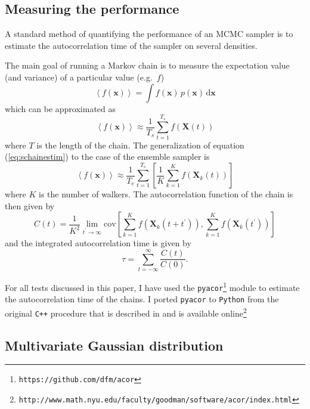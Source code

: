 \documentclass[12pt,preprint]{aastex}
\newcommand{\project}[1]{\texttt{#1}}
\newcommand{\eq}[1]{equation (\ref{eq:#1})}
\newcommand{\eqlabel}[1]{\label{eq:#1}}
\newcommand{\dd}{\mathrm{d}}
\begin{document}
\subsection{Measuring the performance}

A standard method of quantifying the performance of an MCMC sampler is to estimate
the autocorrelation time of the sampler on several densities.

The main goal of running a Markov chain is to measure the expectation value (and
variance) of a particular value (e.g.~$f$)
\begin{equation}
    \left < f(\mathbf{x}) \right > = \int f(\mathbf{x}) \, p (\mathbf{x}) \, \dd \mathbf{x}
\end{equation}
which can be approximated as
\begin{equation}
    \eqlabel{schainestim}
    \left < f(\mathbf{x}) \right > \approx \frac{1}{T_s} \sum_{t=1}^{T_s} f(\mathbf{X}(t))
\end{equation}
where $T$ is the length of the chain.  The generalization of \eq{schainestim} to
the case of the ensemble sampler is
\begin{equation}
    \eqlabel{echainestim}
    \left < f(\mathbf{x}) \right > \approx \frac{1}{T_e} \sum_{t=1}^{T_s} \left [ \frac{1}{K} \sum_{k = 1}^{K} f(\mathbf{X}_k(t)) \right ]
\end{equation}
where $K$ is the number of walkers.  The autocorrelation function of the chain is
then given by
\begin{equation}
    C (t) = \frac{1}{K^2} \lim_{t^\prime \to \infty} \mathrm{cov} \left [ \sum_{k = 1}^{K} f(\mathbf{X}_k (t+t^\prime)),
         \sum_{k = 1}^{K} f(\mathbf{X}_k (t^\prime)) \right ]
\end{equation}
and the integrated autocorrelation time is given by
\begin{equation}
    \tau = \sum_{t= -\infty} ^{\infty} \frac{C(t)}{C(0)} .
\end{equation}

For all tests discussed in this paper, I have used the \project{pyacor}\footnote{\texttt{https://github.com/dfm/acor}}
module to estimate the autocorrelation time of the chains. I ported \project{pyacor} to \project{Python}
from the original \project{C++} procedure that is described in \citet{Goodman:2010} and
is available online\footnote{\texttt{http://www.math.nyu.edu/faculty/goodman/software/acor/index.html}}


\subsection{Multivariate Gaussian distribution}
\end{document}

